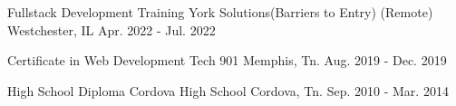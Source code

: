 

\begin{cventries}

  \eduentry
    {Fullstack Development Training}
	{York Solutions(Barriers to Entry)}
    {(Remote) Westchester, IL}
    {Apr. 2022 - Jul. 2022}

  \eduentry
    {Certificate in Web Development} %
    {Tech 901} %
    {Memphis, Tn.} %
    {Aug. 2019 - Dec. 2019} %

  \eduentry
    { High School Diploma } %
    {Cordova High School} %
    {Cordova, Tn.} %
    {Sep. 2010 - Mar. 2014} %

\end{cventries}
